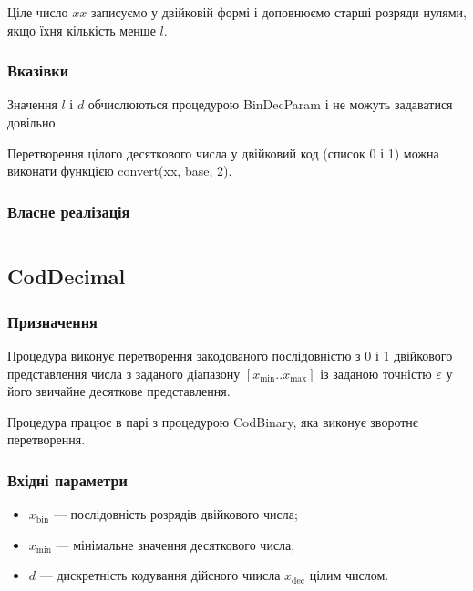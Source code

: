 \documentclass[a4paper, 12pt]{article}
\numberwithin{equation}{section}
\begin{document}
Ціле число $xx$ записуємо у двійковій формі і доповнюємо старші розряди нулями, якщо їхня кількість менше $l$.

\subsubsection*{Вказівки}

Значення $l$ і $d$ обчислюються процедурою BinDecParam і не можуть задаватися довільно. \medskip

Перетворення цілого десяткового числа у двійковий код (список 0 і 1) можна виконати функцією convert(xx, base, 2).

\subsubsection*{Власне реалізація}

\inputminted[firstline=7, lastline=28]{python}{../code/cod_binary.py}

\subsection{CodDecimal}

\subsubsection*{Призначення}

Процедура виконує перетворення закодованого послідовністю з 0 і 1 двійкового представлення числа з заданого діапазону $[x_{\text{min}}..x_{\text{max}}]$ із заданою точністю $\varepsilon$ у його звичайне десяткове представлення. \medskip

Процедура працює в парі з процедурою CodBinary, яка виконує зворотнє перетворення. 

\subsubsection*{Вхідні параметри}

\begin{itemize}
    \item $x_{\text{bin}}$ --- послідовність розрядів двійкового числа;
    \item $x_{\text{min}}$ --- мінімальне значення десяткового числа;
    \item $d$ --- дискретність кодування дійсного чиисла $x_{\text{dec}}$ цілим числом.
\end{itemize}
\end{document}
